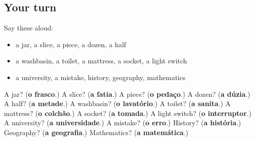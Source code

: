 \subsection*{Your turn}
Say these aloud:

\begin{itemize}
\raggedright
  \item a jar, a slice, a piece, a dozen, a half
  \item a washbasin, a toilet, a mattress, a socket, a light switch
  \item a university, a mistake, history, geography, mathematics
\end{itemize}

\begin{tcolorbox}[breakable,colback=teal!4,colframe=teal!35!black,title={Before you move on}]
A jar? (\textbf{o frasco}.) A slice? (\textbf{a fatia}.) A piece? (\textbf{o pedaço}.) A dozen? (\textbf{a dúzia}.) A half? (\textbf{a metade}.) A washbasin? (\textbf{o lavatório}.) A toilet? (\textbf{a sanita}.) A mattress? (\textbf{o colchão}.) A socket? (\textbf{a tomada}.) A light switch? (\textbf{o interruptor}.) A university? (\textbf{a universidade}.) A mistake? (\textbf{o erro}.) History? (\textbf{a história}.) Geography? (\textbf{a geografia}.) Mathematics? (\textbf{a matemática}.)
\end{tcolorbox}
